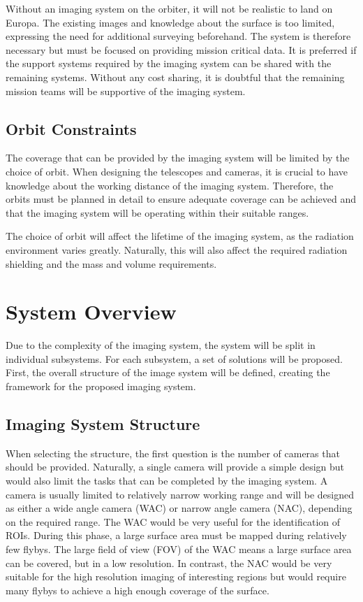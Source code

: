 Without an imaging system on the orbiter, it will not be realistic to land on Europa. The existing images and knowledge about the surface is too limited, expressing the need for additional surveying beforehand. The system is therefore necessary but must be focused on providing mission critical data. It is preferred if the support systems required by the imaging system can be shared with the remaining systems. Without any cost sharing, it is doubtful that the remaining mission teams will be supportive of the imaging system.
\subsection{Orbit Constraints}
The coverage that can be provided by the imaging system will be limited by the choice of orbit. When designing the telescopes and cameras, it is crucial to have knowledge about the working distance of the imaging system. Therefore, the orbits must be planned in detail to ensure adequate coverage can be achieved and that the imaging system will be operating within their suitable ranges.

The choice of orbit will affect the lifetime of the imaging system, as the radiation environment varies greatly. Naturally, this will also affect the required radiation shielding and the mass and volume requirements.
\section{System Overview}
Due to the complexity of the imaging system, the system will be split in individual subsystems. For each subsystem, a set of solutions will be proposed. First, the overall structure of the image system will be defined, creating the framework for the proposed imaging system.
\subsection{Imaging System Structure}
When selecting the structure, the first question is the number of cameras that should be provided. Naturally, a single camera will provide a simple design but would also limit the tasks that can be completed by the imaging system. A camera is usually limited to relatively narrow working range and will be designed as either a wide angle camera (WAC) or narrow angle camera (NAC), depending on the required range. The WAC would be very useful for the identification of ROIs. During this phase, a large surface area must be mapped during relatively few flybys. The large field of view (FOV) of the WAC means a large surface area can be covered, but in a low resolution. In contrast, the NAC would be very suitable for the high resolution imaging of interesting regions but would require many flybys to achieve a high enough coverage of the surface.

